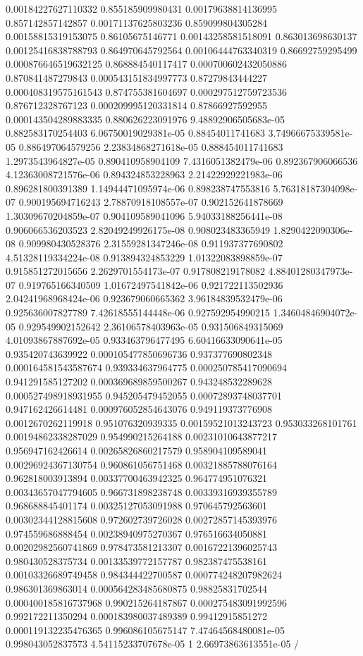 \begin{table}
\begin{tabu}
\begin{sparkline}{10}
0.00184227627110332 0.855185909980431 0.00179638814136995 0.857142857142857 0.00171137625803236 0.859099804305284 0.00158815319153075 0.86105675146771 0.00143258581518091 0.863013698630137 0.00125416838788793 0.864970645792564 0.00106444763340319 0.86692759295499 0.000876646519632125 0.868884540117417 0.000700602432050886 0.870841487279843 0.000543151834997773 0.87279843444227 0.000408319575161543 0.874755381604697 0.000297512759723536 0.876712328767123 0.000209995120331814 0.87866927592955 0.000143504289883335 0.880626223091976 9.48892906505683e-05 0.882583170254403 6.06750019029381e-05 0.88454011741683 3.74966675339581e-05 0.886497064579256 2.23834868271618e-05 0.888454011741683 1.2973543964827e-05 0.890410958904109 7.4316051382479e-06 0.892367906066536 4.12363008721576e-06 0.894324853228963 2.21422929221983e-06 0.896281800391389 1.14944471095974e-06 0.898238747553816 5.76318187304098e-07 0.900195694716243 2.78870918108557e-07 0.902152641878669 1.30309670204859e-07 0.904109589041096 5.94033188256441e-08 0.906066536203523 2.82049249926175e-08 0.908023483365949 1.8290422090306e-08 0.909980430528376 2.31559281347246e-08 0.911937377690802 4.51328119334224e-08 0.913894324853229 1.01322083898859e-07 0.915851272015656 2.2629701554173e-07 0.917808219178082 4.88401280347973e-07 0.919765166340509 1.01672497541842e-06 0.921722113502936 2.04241968968424e-06 0.923679060665362 3.96184839532479e-06 0.925636007827789 7.42618555144448e-06 0.927592954990215 1.34604846904072e-05 0.929549902152642 2.36106578403963e-05 0.931506849315069 4.01093867887692e-05 0.933463796477495 6.60416633090641e-05 0.935420743639922 0.000105477850696736 0.937377690802348 0.000164581543587674 0.939334637964775 0.000250785417090694 0.941291585127202 0.000369689859500267 0.943248532289628 0.000527498918931955 0.945205479452055 0.00072893748037701 0.947162426614481 0.000976052854643076 0.949119373776908 0.0012670262119918 0.951076320939335 0.00159521013243723 0.953033268101761 0.00194862338287029 0.954990215264188 0.00231010643877217 0.956947162426614 0.00265826860217579 0.958904109589041 0.00296924367130754 0.960861056751468 0.00321885788076164 0.962818003913894 0.00337700463942325 0.964774951076321 0.00343657047794605 0.966731898238748 0.00339316939355789 0.968688845401174 0.00325127053091988 0.970645792563601 0.00302344128815608 0.972602739726028 0.00272857145393976 0.974559686888454 0.00238940975270367 0.976516634050881 0.00202982560741869 0.978473581213307 0.00167221396025743 0.980430528375734 0.00133539772157787 0.982387475538161 0.00103326689749458 0.984344422700587 0.000774248207982624 0.986301369863014 0.000564283485680875 0.98825831702544 0.000400185816737968 0.990215264187867 0.000275483091992596 0.992172211350294 0.000183980037489389 0.99412915851272 0.000119132235476365 0.996086105675147 7.47464568480081e-05 0.998043052837573 4.54115233707678e-05 1 2.66973863613551e-05 /

\end{sparkline}
\end{tabu}
\end{table}
